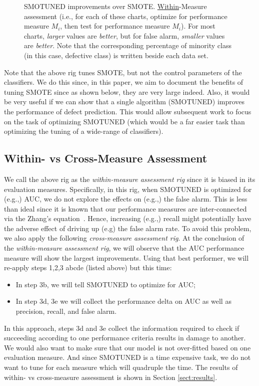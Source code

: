 \documentclass[sigconf]{acmart}
\newcommand{\bi}{\begin{itemize}[leftmargin=0.4cm]}
\newcommand{\ei}{\end{itemize}}
\theoremstyle{break}
\newcommand{\sma}{{\sc SMOTE}}
\newcommand{\smb}{{\sc SMOTUNED}}
\begin{document}
\begin{figure}[!t]
    \caption{{\smb} improvements over {\sma}. \underline{Within}-Measure
    assessment (i.e., for each of these charts,
    optimize for performance measure $M_i$, then test for
    performance measure $M_i$). For most charts,
    {\em larger} values are {\em better}, but for false alarm,
    {\em smaller} values are {\em better}. Note that the corresponding percentage of minority class (in this case, defective class) is written beside each data set.}
    \label{fig:tuned}
    \vspace{-0.3cm}
\end{figure}


 
   
   
Note that the above rig tunes {\sma}, but not the control parameters of the classifiers.
We do this since, in this paper,  we aim to document the   benefits of tuning {\sma} since as shown below, they are very large indeed. Also, it would be very useful if we can show that a single algorithm ({\smb})  improves the performance of defect prediction. This would allow
subsequent work to focus on the task of optimizing  {\smb} (which would be a far easier
task than optimizing the tuning of a wide-range of classifiers). 
 

\subsection{Within- vs Cross-Measure Assessment}
\label{sect:wcm}

We call the above rig as the {\em within-measure assessment rig} since it is  biased in its evaluation measures. Specifically,  in this rig,
when {\smb} is optimized for (e.g.,) AUC, we do not explore the effects on (e.g.,) the false alarm. This is less than ideal
since it is known that our performance measures are inter-connected via the Zhang's equation~\cite{zhang2007comments}. Hence, increasing (e.g.,) recall might potentially have the adverse
effect of  driving up (e.g) the false alarm rate. 
To avoid this problem, we also apply the following {\em cross-measure assessment rig}.
At the conclusion of the {\em within-measure assessment rig}, we will observe  that the AUC performance measure will show the largest improvements. Using that best performer, we will re-apply steps 1,2,3 abcde (listed above) but this time:
\bi
\item In step 3b, we will tell {\smb} to optimize for AUC;
\item In step 3d, 3e we will collect the performance delta on AUC as well as precision, recall,
and false alarm.
\ei
In this approach, steps 3d and 3e collect the information required   to check if succeeding according to one performance criteria results in damage to another. We would also want to make sure that our model is not over-fitted based on one evaluation measure. And since {\smb} is a time expensive task, we do not want to tune for each measure which will quadruple the time. The results of within- vs cross-measure assessment is shown in Section \ref{sect:results}.
\end{document}
